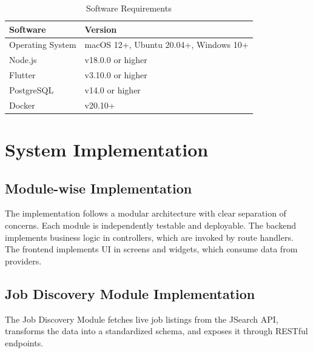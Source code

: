 \begin{table}[H]
\centering
\caption{Software Requirements}
\label{tab:software}
\begin{tabular}{|l|l|}
\hline
\textbf{Software} & \textbf{Version} \\
\hline
Operating System & macOS 12+, Ubuntu 20.04+, Windows 10+ \\
\hline
Node.js & v18.0.0 or higher \\
\hline
Flutter & v3.10.0 or higher \\
\hline
PostgreSQL & v14.0 or higher \\
\hline
Docker & v20.10+ \\
\hline
\end{tabular}
\end{table}

\chapter{System Implementation}

\section{Module-wise Implementation}

The implementation follows a modular architecture with clear separation of concerns. Each module is independently testable and deployable. The backend implements business logic in controllers, which are invoked by route handlers. The frontend implements UI in screens and widgets, which consume data from providers.

\section{Job Discovery Module Implementation}

The Job Discovery Module fetches live job listings from the JSearch API, transforms the data into a standardized schema, and exposes it through RESTful endpoints.

